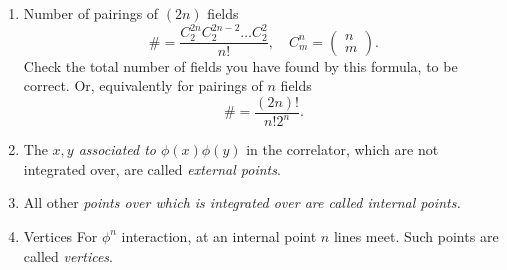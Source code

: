 \begin{enumerate}
\begin{mybox}{How to calculate symmetry factors}
			\[
				\begin{gathered}
		\feynmandiagram [small, vertical=a to b, black] {
			a[particle=i] [dot]-- b [particle=j] [dot],
			a-- [half left]b ,
			b-- [half left]a ,
		};
	\end{gathered}
\quad \Rightarrow \quad S_3, |S_3|=3!.	\]
\end{mybox}
THe symmetry comes from the internal points, because the external points are distinct in their connections to the other points.
\item Number of pairings of $(2n)$ fields 
\begin{equation}
	\#= \frac{C^{2n}_2 C^{2n-2}_2 \dots C^2_2}{n!}, \quad C^n_m=\begin{pmatrix}
	n\\
	m
	\end{pmatrix}.
\end{equation}
Check the total number of fields you have found by this formula, to be correct. Or, equivalently for pairings of $n$ fields
\begin{equation}
	\# = \frac{(2n)!}{n! 2^n}.
\end{equation}
\item The \emph{$x,y$ associated to $\phi(x)\phi(y)$} in the correlator, which are not integrated over, are called \emph{external points}.
\item All other \emph{points over which is integrated over are called internal points.}
\item  \begin{mybox}{Vertices}
	For $\phi^n$ interaction, at an internal point $n$ lines meet. Such points are called \emph{vertices}.
\end{mybox}
\end{enumerate}

